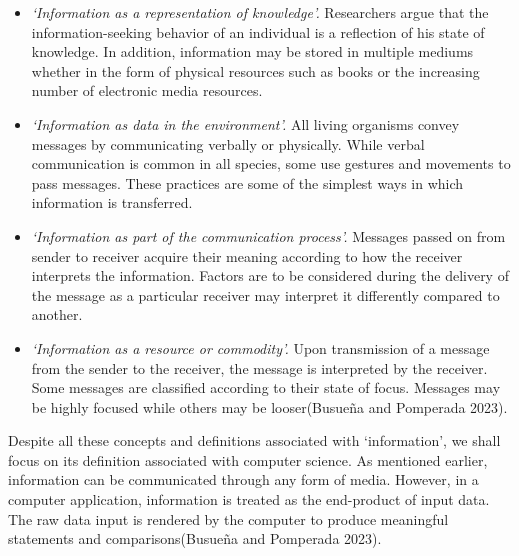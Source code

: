 \documentclass[
  letterpaper,
  DIV=11,
  numbers=noendperiod]{scrreprt}
\providecommand{\tightlist}{%
  \setlength{\itemsep}{0pt}\setlength{\parskip}{0pt}}\usepackage{longtable,booktabs,array}
\begin{document}
\begin{itemize}
\tightlist
\item
  \emph{`Information as a representation of knowledge'.} Researchers
  argue that the information-seeking behavior of an individual is a
  reflection of his state of knowledge. In addition, information may be
  stored in multiple mediums whether in the form of physical resources
  such as books or the increasing number of electronic media resources.
\item
  \emph{`Information as data in the environment'.} All living organisms
  convey messages by communicating verbally or physically. While verbal
  communication is common in all species, some use gestures and
  movements to pass messages. These practices are some of the simplest
  ways in which information is transferred.
\item
  \emph{`Information as part of the communication process'.} Messages
  passed on from sender to receiver acquire their meaning according to
  how the receiver interprets the information. Factors are to be
  considered during the delivery of the message as a particular receiver
  may interpret it differently compared to another.
\item
  \emph{`Information as a resource or commodity'.} Upon transmission of
  a message from the sender to the receiver, the message is interpreted
  by the receiver. Some messages are classified according to their state
  of focus. Messages may be highly focused while others may be
  looser(Busueña and Pomperada 2023).
\end{itemize}

Despite all these concepts and definitions associated with
`information', we shall focus on its definition associated with computer
science. As mentioned earlier, information can be communicated through
any form of media. However, in a computer application, information is
treated as the end-product of input data. The raw data input is rendered
by the computer to produce meaningful statements and comparisons(Busueña
and Pomperada 2023).
\end{document}
